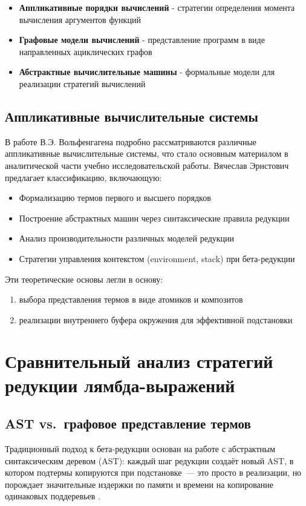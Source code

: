 \begin{itemize}
    \item \textbf{Аппликативные порядки вычислений} - стратегии определения момента вычисления аргументов функций
    \item \textbf{Графовые модели вычислений} - представление программ в виде направленных ациклических графов
    \item \textbf{Абстрактные вычислительные машины} - формальные модели для реализации стратегий вычислений
\end{itemize}

\subsection{Аппликативные вычислительные системы}
В работе В.Э. Вольфенгагена \cite{Wolfengagen2004} подробно рассматриваются различные аппликативные вычислительные системы, что стало основным материалом в аналитической части учебно исследовательской работы. Вячеслав Эрнстович предлагает классификацию, включающую:

\begin{itemize}
  \item Формализацию термов первого и высшего порядков
  \item Построение абстрактных машин через синтаксические правила редукции
  \item Анализ производительности различных моделей редукции
  \item Стратегии управления контекстом (environment, stack) при бета-редукции
\end{itemize}

Эти теоретические основы легли в основу:
\begin{enumerate}
  \item выбора представления термов в виде атомиков и композитов
  \item реализации внутреннего буфера окружения для эффективной подстановки
\end{enumerate}

\section{Сравнительный анализ стратегий редукции лямбда-выражений}

\subsection{AST vs.\ графовое представление термов}
Традиционный подход к бета‑редукции основан на работе с абстрактным синтаксическим деревом (AST): каждый шаг редукции создаёт новый AST, в котором подтермы копируются при подстановке — это просто в реализации, но порождает значительные издержки по памяти и времени на копирование одинаковых поддеревьев \cite{Pierce2002}\cite{HindleySeldin2008}.  

